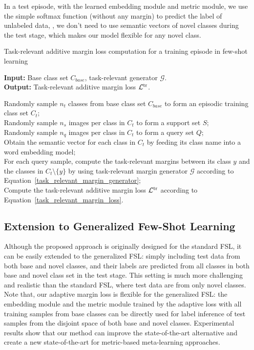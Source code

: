 \documentclass[10pt,twocolumn,letterpaper]{article}
\begin{document}
In a test episode, with the learned embedding module and metric module, we use the simple softmax function (without any margin) to predict the label of unlabeled data, \ie, we don't need to use semantic vectors of novel classes during the test stage, which makes our model flexible for any novel class.

\begin{algorithm}[t]
\caption{Task-relevant additive margin loss computation for a training episode in few-shot learning}
\label{alg:traml}
\textbf{Input:} Base class set $C_{base}$, task-relevant  generator $\mathcal{G}$.\\ 
\textbf{Output:} Task-relevant additive margin loss $\mathcal{L}^{\rm tr}$.

\begin{algorithmic}[1]
\STATE  Randomly sample $n_t$ classes from base class set $C_{base}$ to form an episodic training class set $C_{t}$;\\
\STATE  Randomly sample $n_s$ images per class in $C_{t}$ to form a support set $S$; \\
\STATE  Randomly sample $n_q$ images per class in $C_{t}$ to form a query set $Q$; \\
\STATE  Obtain the semantic vector for each class in $C_{t}$ by feeding its class name into a word embedding model; \\
\STATE  For each query sample, compute the task-relevant margins between its class $y$ and the classes in $C_{t}\!\setminus\!\{y\}$ by using task-relevant margin generator $\mathcal{G}$ according to Equation~\ref{task_relevant_margin_generator};\\
\STATE  Compute the task-relevant additive margin loss $\mathcal{L}^{\rm tr}$ according to Equation~\ref{task_relevant_margin_loss}.
\end{algorithmic}
\end{algorithm}

\subsection{Extension to Generalized Few-Shot Learning}

Although the proposed approach is originally designed for the standard FSL, it can be easily extended to the generalized FSL: simply including test data from both base and novel classes, and their labels are predicted from all classes in
both base and novel class set in the test stage. This setting is much more challenging
and realistic than the standard FSL, where test data are from only novel classes. Note that, our adaptive margin loss is flexible for the generalized FSL: the embedding module and the metric module trained by the adaptive loss with all training samples from base classes can be directly used for label inference of test samples from the disjoint space of both base and novel classes. Experimental results show that our method can improve the state-of-the-art alternative and create a new state-of-the-art for metric-based meta-learning approaches.
\end{document}
